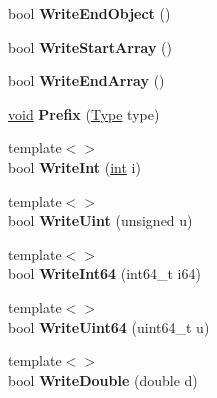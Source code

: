 \begin{DoxyCompactItemize}
\item 
\hypertarget{class_writer_a9f76fcffaf403a49a311de074a23de2d}{}bool {\bfseries Write\+End\+Object} ()\label{class_writer_a9f76fcffaf403a49a311de074a23de2d}

\item 
\hypertarget{class_writer_af3804bde535cf36e0733c07a56742111}{}bool {\bfseries Write\+Start\+Array} ()\label{class_writer_af3804bde535cf36e0733c07a56742111}

\item 
\hypertarget{class_writer_a9d7ec17cfb0b64a88c009871ba741f52}{}bool {\bfseries Write\+End\+Array} ()\label{class_writer_a9d7ec17cfb0b64a88c009871ba741f52}

\item 
\hypertarget{class_writer_ad56f2e953b7919ad2157a2fc2bedf873}{}\hyperlink{_s_d_l__audio_8h_a52835ae37c4bb905b903cbaf5d04b05f}{void} {\bfseries Prefix} (\hyperlink{rapidjson_8h_a1d1cfd8ffb84e947f82999c682b666a7}{Type} type)\label{class_writer_ad56f2e953b7919ad2157a2fc2bedf873}

\item 
\hypertarget{class_writer_abefb163a93b376d056edecad5a7a82ef}{}{\footnotesize template$<$$>$ }\\bool {\bfseries Write\+Int} (\hyperlink{_s_d_l__thread_8h_a6a64f9be4433e4de6e2f2f548cf3c08e}{int} i)\label{class_writer_abefb163a93b376d056edecad5a7a82ef}

\item 
\hypertarget{class_writer_a9665a4a1549b286944b21927b80060cf}{}{\footnotesize template$<$$>$ }\\bool {\bfseries Write\+Uint} (unsigned u)\label{class_writer_a9665a4a1549b286944b21927b80060cf}

\item 
\hypertarget{class_writer_a3528a42394d50f3b92659de517433c85}{}{\footnotesize template$<$$>$ }\\bool {\bfseries Write\+Int64} (int64\+\_\+t i64)\label{class_writer_a3528a42394d50f3b92659de517433c85}

\item 
\hypertarget{class_writer_a025b3d2ca07d539a7067575e95f5578d}{}{\footnotesize template$<$$>$ }\\bool {\bfseries Write\+Uint64} (uint64\+\_\+t u)\label{class_writer_a025b3d2ca07d539a7067575e95f5578d}

\item 
\hypertarget{class_writer_af317e1d24249b8c68503a6253c703bd2}{}{\footnotesize template$<$$>$ }\\bool {\bfseries Write\+Double} (double d)\label{class_writer_af317e1d24249b8c68503a6253c703bd2}

\end{DoxyCompactItemize}
